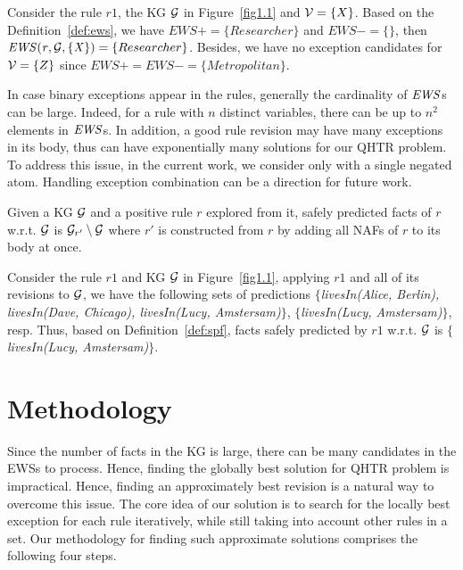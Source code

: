\begin{example}
Consider the rule $r1$, the KG $\mathcal{G}$ in Figure~\ref{fig1.1} and $\mathcal{V} = \{X\}$. Based on the Definition~\ref{def:ews}, we have $EWS+ = \{Researcher\}$ and $EWS- = \{\}$, then $\mathit{EWS(r,\mathcal{G},\{X\})}=\{Researcher\}$. Besides, we have no exception candidates for $\mathcal{V} = \{Z\}$ since $EWS+ = EWS- = \{Metropolitan\}$.
\end{example}

In case binary exceptions appear in the rules, generally the cardinality of $\mathit{EWS}$s can be large. Indeed, for a rule with $n$ distinct variables, there can be up to $n^2$ elements in $\mathit{EWS}$s. In addition, a good rule revision may have many exceptions in its body, thus can have exponentially many solutions for our QHTR problem. To address this issue, in the current work, we consider only with a single negated atom. Handling exception combination can be a direction for future work.

\begin{definition} \label{def:spf}
Given a KG $\mathcal{G}$ and a positive rule $r$ explored from it, safely predicted facts of $r$ w.r.t. $\mathcal{G}$ is $\mathcal{G}_{r'} \setminus \mathcal{G}$ where $r'$ is constructed from $r$ by adding all NAFs of $r$ to its body at once.
\end{definition}

\begin{example}
Consider the rule $r1$ and KG $\mathcal{G}$ in Figure~\ref{fig1.1}, applying $r1$ and all of its revisions to $\mathcal{G}$, we have the following sets of predictions \textit{$\{$livesIn(Alice, Berlin), livesIn(Dave, Chicago), livesIn(Lucy, Amstersam)$\}$}, \textit{$\{$livesIn(Lucy, Amstersam)$\}$}, resp. Thus, based on Definition~\ref{def:spf}, facts safely predicted by $r1$ w.r.t. $\mathcal{G}$ is \textit{$\{$livesIn(Lucy, Amstersam)$\}$}.
\end{example}

\section{Methodology}\label{sec:meth}

Since the number of facts in the KG is large, there can be many candidates in the EWSs to process. Hence, finding the globally best solution for QHTR problem is impractical. Hence, finding an approximately best revision is a natural way to overcome this issue. The core idea of our solution is to search for the locally best exception for each rule iteratively, while still taking into account other rules in a set. Our methodology for finding such approximate solutions comprises the following four steps.
\medskip

